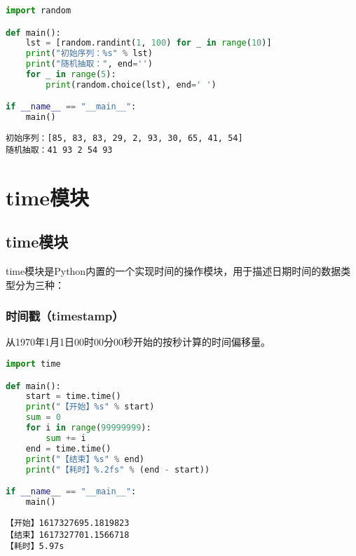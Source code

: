 
\begin{lstlisting}[language=Python]
import random

def main():
    lst = [random.randint(1, 100) for _ in range(10)]
    print("初始序列：%s" % lst)
    print("随机抽取：", end='')
    for _ in range(5):
        print(random.choice(lst), end=' ')

if __name__ == "__main__":
    main()
\end{lstlisting}

\begin{tcolorbox}
	\begin{verbatim}
初始序列：[85, 83, 83, 29, 2, 93, 30, 65, 41, 54]
随机抽取：41 93 2 54 93
\end{verbatim}
\end{tcolorbox}

\newpage

\section{time模块}

\subsection{time模块}

time模块是Python内置的一个实现时间的操作模块，用于描述日期时间的数据类型分为三种：

\subsubsection{时间戳（timestamp）}

从1970年1月1日00时00分00秒开始的按秒计算的时间偏移量。\\


\begin{lstlisting}[language=Python]
import time

def main():
    start = time.time()
    print("【开始】%s" % start)
    sum = 0
    for i in range(99999999):
        sum += i
    end = time.time()
    print("【结束】%s" % end)
    print("【耗时】%.2fs" % (end - start))

if __name__ == "__main__":
    main()
\end{lstlisting}

\begin{tcolorbox}
	\begin{verbatim}
【开始】1617327695.1819823
【结束】1617327701.1566718
【耗时】5.97s
\end{verbatim}
\end{tcolorbox}

